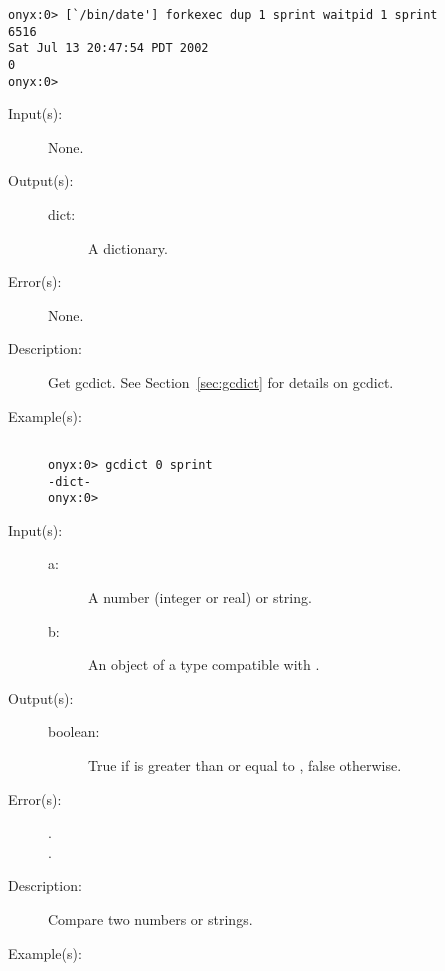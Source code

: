 \begin{description}
\begin{description}
\begin{verbatim}
onyx:0> [`/bin/date'] forkexec dup 1 sprint waitpid 1 sprint
6516
Sat Jul 13 20:47:54 PDT 2002
0
onyx:0>
		\end{verbatim}
	\end{description}
\label{systemdict:gcdict}
\item[{\onyxop{--}{gcdict}{dict}}: ]
	\begin{description}\item[]
	\item[Input(s): ] None.
	\item[Output(s): ]
		\begin{description}\item[]
		\item[dict: ]
			A dictionary.
		\end{description}
	\item[Error(s): ] None.
	\item[Description: ]
		Get gcdict.  See Section~\ref{sec:gcdict} for details on
		gcdict.
	\item[Example(s): ]\begin{verbatim}

onyx:0> gcdict 0 sprint
-dict-
onyx:0>
		\end{verbatim}
	\end{description}
\label{systemdict:ge}
\item[{\onyxop{a b}{ge}{boolean}}: ]
	\begin{description}\item[]
	\item[Input(s): ]
		\begin{description}\item[]
		\item[a: ]
			A number (integer or real) or string.
		\item[b: ]
			An object of a type compatible with .
		\end{description}
	\item[Output(s): ]
		\begin{description}\item[]
		\item[boolean: ]
			True if  is greater than or equal to ,
			false otherwise.
		\end{description}
	\item[Error(s): ]
		\begin{description}\item[]
		\item[.]
		\item[.]
		\end{description}
	\item[Description: ]
		Compare two numbers or strings.
	\item[Example(s): ]\begin{verbatim}


\end{verbatim}
\end{description}
\end{description}
